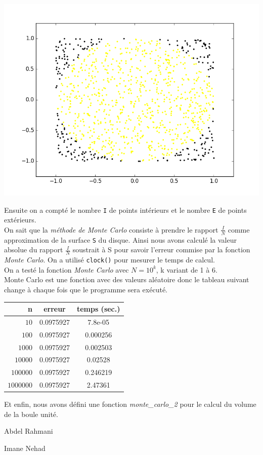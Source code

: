 \documentclass{article}
\begin{document}
\begin{center}
    \includegraphics[scale=0.5]{figure2.png}
\end{center}


Ensuite on a compté le nombre \texttt{I} de points intérieurs et le nombre \texttt{E} de points extérieurs. \\ 

	On sait que la \textit{méthode de Monte Carlo} consiste à prendre le rapport $\frac{I}{N}$ comme approximation de la surface \texttt{S} du disque. Ainsi nous avons calculé la valeur absolue du rapport $\frac{I}{N}$ soustrait à S pour savoir l'erreur commise par la fonction \textit{Monte Carlo}. On a utilisé \texttt{clock()} pour mesurer le temps de calcul.
\\

	On a testé la fonction \textit{Monte Carlo} avec $N=10^k$, k variant de 1 à 6.\\

	Monte Carlo est une fonction avec des valeurs aléatoire donc le tableau suivant change à chaque fois que le programme sera exécuté.\\

\begin{center}
\begin{tabular}{r | c | c}
{n} & erreur & temps (sec.)\\
\hline
$10$ & {0.0975927} & {7.8e-05}\\
$100$ & {0.0975927 } & {0.000256}\\
$1000$ & {0.0975927} & {0.002503}\\
$10000$ & {0.0975927} & {0.02528}\\
$100000$ & {0.0975927} & {0.246219}\\
$1000000$ & {0.0975927} & {2.47361}
\end{tabular}
\end{center}

Et enfin, nous avons défini une fonction \textit{monte\_carlo\_2} pour le calcul du volume de la boule unité.  

\begin{center}
Abdel Rahmani
\end{center}
\begin{center}
Imane Nehad
\end{center}
\end{document}
